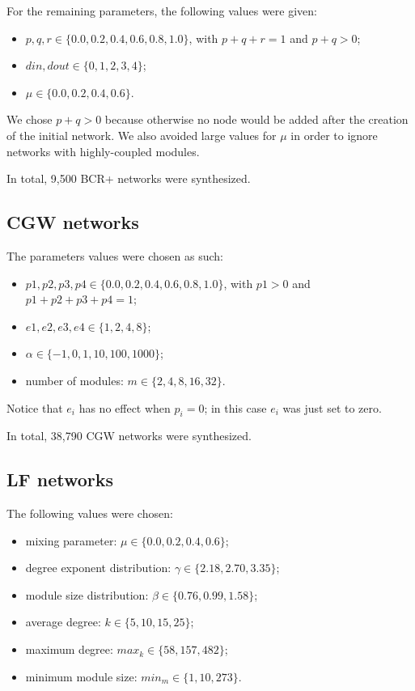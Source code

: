 For the remaining parameters, the following values were given:

\begin{itemize}
\item $p, q, r \in \{0.0, 0.2, 0.4, 0.6, 0.8, 1.0\}$, with $p + q + r = 1$ and
$p + q > 0$;
\item $din, dout \in \{0, 1, 2, 3, 4\}$;
\item $\mu \in \{0.0, 0.2, 0.4, 0.6\}$.
\end{itemize}

We chose $p + q > 0$ because otherwise no node would be added after the
creation of the initial network. We also avoided large values for $\mu$ in
order to ignore networks with highly-coupled modules. 

In total, 9,500 BCR+ networks were synthesized.

\subsection{CGW networks}

The parameters values were chosen as such:

\begin{itemize}
\item $p1, p2, p3, p4 \in \{0.0, 0.2, 0.4, 0.6, 0.8, 1.0\}$, with $p1 > 0$ and
$p1 + p2 + p3 + p4 = 1$;
\item $e1, e2, e3, e4 \in \{1, 2, 4, 8\}$;
\item $\alpha \in \{-1, 0, 1, 10, 100, 1000\}$;
\item number of modules: $m \in \{2, 4, 8, 16, 32\}$.
\end{itemize}

Notice that $e_i$ has no effect when $p_i = 0$; in this case $e_i$ was just set
to zero.

In total, 38,790 CGW networks were synthesized.

\subsection{LF networks}

The following values were chosen:

\begin{itemize}
  \item mixing parameter: $\mu \in \{0.0, 0.2, 0.4, 0.6\}$;
  \item degree exponent distribution: $\gamma \in \{2.18, 2.70, 3.35\}$;
  \item module size distribution: $\beta \in \{0.76, 0.99, 1.58\}$;
  \item average degree: $k \in \{5, 10, 15, 25\}$;
  \item maximum degree: $max_k \in \{58, 157, 482\}$;
  \item minimum module size: $min_m \in \{1, 10, 273\}$.
\end{itemize}


